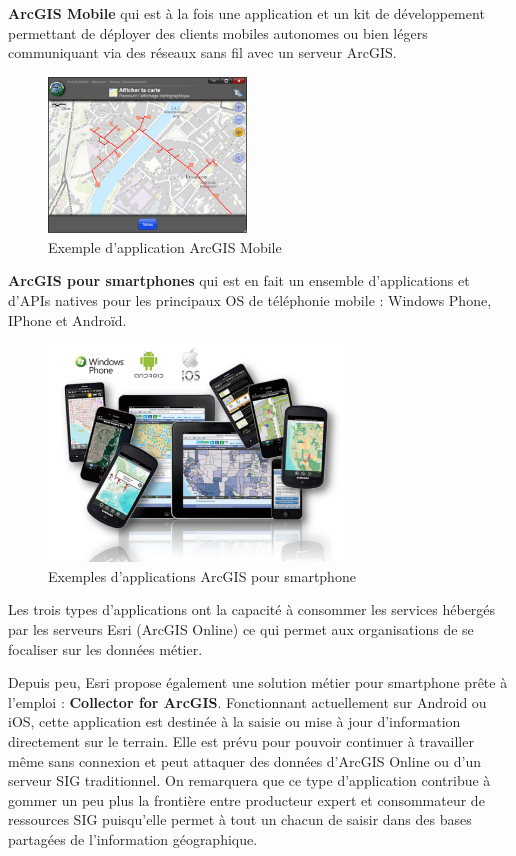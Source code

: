 \documentclass[11pt]{article}
\begin{document}
\textbf{ArcGIS Mobile} qui est à la fois une application et un kit de développement permettant de déployer des clients mobiles autonomes ou bien légers communiquant via des réseaux sans fil avec un serveur ArcGIS.
\begin{figure}[H]
	\center \includegraphics[width=0.47\textwidth]{img/cours/arcgis_mobile.png}
	\caption{Exemple d'application ArcGIS Mobile}
\end{figure}

\textbf{ArcGIS pour smartphones} qui est en fait un ensemble d’applications et d’APIs natives pour les principaux OS de téléphonie mobile : Windows Phone, IPhone et Androïd. 

\begin{figure}[H]
	\center \includegraphics[width=0.70\textwidth]{img/cours/arcgis_for_smartphone.png}
	\caption{Exemples d'applications ArcGIS pour smartphone}
\end{figure}

Les trois types d’applications ont la capacité à consommer les services hébergés par les serveurs Esri (ArcGIS Online) ce qui permet aux organisations de se focaliser sur les données métier.

Depuis peu, Esri propose également une solution métier pour smartphone prête à l'emploi : \textbf{Collector for ArcGIS}. Fonctionnant actuellement sur Android ou iOS, cette application est destinée à la saisie ou mise à jour d'information directement sur le terrain. Elle est prévu pour pouvoir continuer à travailler même sans connexion et peut attaquer des données d'ArcGIS Online ou d'un serveur SIG traditionnel. On remarquera que ce type d'application contribue à gommer un peu plus la frontière entre producteur expert et consommateur de ressources SIG puisqu'elle permet à tout un chacun de saisir dans des bases partagées de l'information géographique.
\end{document}
